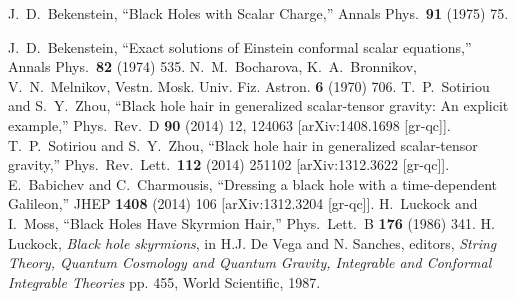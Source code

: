 \begin{small}
\begin{thebibliography}{99}

  J.~D.~Bekenstein,
  ``Black Holes with Scalar Charge,''
  Annals Phys.\  {\bf 91} (1975) 75.

  J.~D.~Bekenstein,
  ``Exact solutions of Einstein conformal scalar equations,''
  Annals Phys.\  {\bf 82} (1974) 535.
N.~M.~Bocharova, K.~A.~Bronnikov, V.~N.~Melnikov,
Vestn. Mosk. Univ. Fiz. Astron. {\bf 6} (1970) 706. 
  T.~P.~Sotiriou and S.~Y.~Zhou,
  ``Black hole hair in generalized scalar-tensor gravity: An explicit example,''
  Phys.\ Rev.\ D {\bf 90} (2014) 12,  124063
  [arXiv:1408.1698 [gr-qc]].
  T.~P.~Sotiriou and S.~Y.~Zhou,
  ``Black hole hair in generalized scalar-tensor gravity,''
  Phys.\ Rev.\ Lett.\  {\bf 112} (2014) 251102
  [arXiv:1312.3622 [gr-qc]].
  E.~Babichev and C.~Charmousis,
  ``Dressing a black hole with a time-dependent Galileon,''
  JHEP {\bf 1408} (2014) 106
  [arXiv:1312.3204 [gr-qc]].
  H.~Luckock and I.~Moss,
  ``Black Holes Have Skyrmion Hair,''
  Phys.\ Lett.\ B {\bf 176} (1986) 341.
H. Luckock, {\it Black hole skyrmions}, in H.J. De Vega and N. Sanches, editors,
{\it String Theory, Quantum Cosmology and Quantum Gravity, Integrable and
Conformal Integrable Theories} pp. 455, World Scientific, 1987. 


\end{thebibliography}
\end{small}
